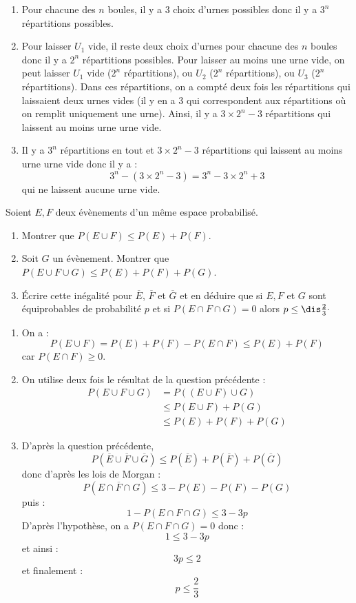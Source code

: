 \documentclass[a4paper,10pt]{report}
\begin{document}
\corr 

\begin{enumerate}
\item Pour chacune des $n$ boules, il y a $3$ choix d'urnes possibles donc il y a $3^n$ répartitions possibles.
\item Pour laisser $U_1$ vide, il reste deux choix d'urnes pour chacune des $n$ boules donc il y a $2^n$ répartitions possibles. Pour laisser au moins une urne vide, on peut laisser $U_1$ vide ($2^n$ répartitions), ou $U_2$  ($2^n$ répartitions), ou $U_3$  ($2^n$ répartitions). Dans ces répartitions, on a compté deux fois les répartitions qui laissaient deux urnes vides (il y en a $3$ qui correspondent aux répartitions où on remplit uniquement une urne). Ainsi, il y a $3 \times 2^n - 3$ répartitions qui laissent au moins urne urne vide.
\item Il y a $3^n$ répartitions en tout et $3 \times 2^n - 3$ répartitions qui laissent au moins urne urne vide donc il y a :
$$ 3^n - (3 \times 2^n - 3) = 3^n - 3 \times 2^n + 3$$
qui ne laissent aucune urne vide.
\end{enumerate}

\begin{Exa}  Soient $E,F$ deux évènements d'un même espace probabilisé.
\begin{enumerate}
\item Montrer que $P(E \cup F) \leq P(E) + P(F)$.
\item Soit $G$ un évènement. Montrer que $P(E \cup F \cup G) \leq P(E) + P(F) + P(G)$.
\item Écrire cette inégalité pour $\overline{E}$, $\overline{F}$ et $\overline{G}$ et en déduire que si $E,F$ et $G$ sont équiprobables de probabilité $p$ et si $P(E \cap F \cap G)=0$ alors $p \leq \dis \frac{2}{3} \cdot$
\end{enumerate}
\end{Exa}

\corr 
\begin{enumerate}
\item On a :
$$ P(E \cup F) = P(E) + P(F) - P(E \cap F) \leq P(E)+P(F)$$
car $P(E \cap F) \geq 0$.
\item On utilise deux fois le résultat de la question précédente :
\begin{align*}
P(E \cup F \cup G) & = P((E \cup F) \cup G) \\
& \leq P(E \cup F) + P(G) \\
& \leq P(E) + P(F) + P(G)
\end{align*}
\item D'après la question précédente,
$$ P(\overline{E} \cup \overline{F} \cup \overline{G})  \leq  P(\overline{E}) + P(\overline{F}) + P(\overline{G})$$
donc d'après les lois de Morgan :
$$ P(\overline{E \cap F \cap G}) \leq 3-P(E)-P(F)-P(G)$$
puis :
$$ 1-P(E \cap F \cap G) \leq 3-3p$$
D'après l'hypothèse, on a $P(E \cap F \cap G)=0$ donc :
$$ 1 \leq 3-3p$$
et ainsi :
$$3p \leq 2$$
et finalement :
$$ p \leq \dfrac{2}{3}$$
\end{enumerate}
\end{document}
